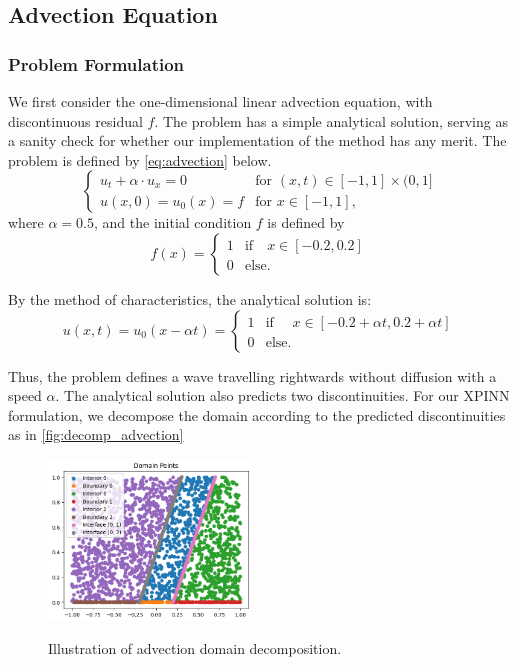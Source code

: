 \subsection{Advection Equation}\label{sec:advection}
\subsubsection{Problem Formulation}
We first consider the one-dimensional linear advection equation, with discontinuous residual $f$.
The problem has a simple analytical solution, serving as a sanity check for whether our implementation of the method has any merit.
The problem is defined by \eqref{eq:advection} below.
\begin{equation}
\begin{cases}
    u_t + \alpha \cdot u_x= 0 &\text{for } (x,t)\in [-1, 1] \times (0, 1] \\ 
    u(x, 0) = u_0(x)= f &\text{for } x \in [-1, 1],
\end{cases}
\label{eq:advection}
\end{equation}
where $\alpha = 0.5$, and the initial condition $f$ is defined by
\begin{equation*}
    f(x) =
    \begin{cases}
        1 &\text{if} \quad x \in [-0.2, 0.2] \\
        0 &\text{else}.
    \end{cases}
\end{equation*}

By the method of characteristics, the analytical solution is:
\begin{equation}
    u(x,t) = u_0(x-\alpha t)=
    \begin{cases}
        1 &\text{if } \quad x \in [-0.2 + \alpha t, 0.2 + \alpha t] \\
        0 &\text{else}.
    \end{cases}
\end{equation}

Thus, the problem defines a wave travelling rightwards without diffusion with a speed $\alpha$. The analytical solution also predicts two discontinuities. For our XPINN formulation, we decompose the domain according to the predicted discontinuities as in \autoref{fig:decomp_advection} 
\begin{figure}[htb]
    \centering
    \includegraphics[width=0.48\textwidth]{Project1XPINNs/figures/advection/advection_decomp.png}
    \label{subfig:single}
    \caption{Illustration of advection domain decomposition.}
    \label{fig:decomp_advection}
\end{figure}


